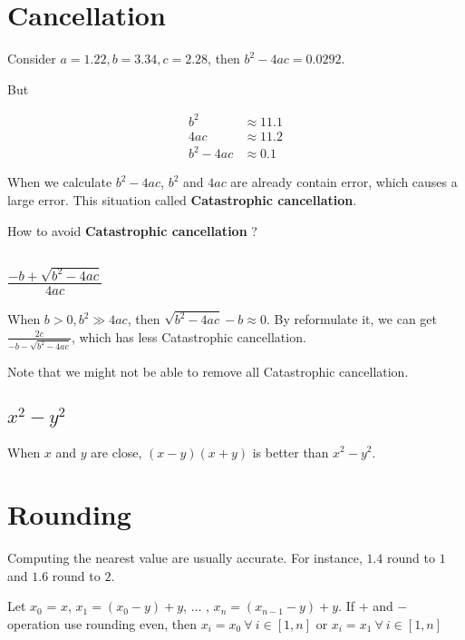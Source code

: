 \section{Cancellation}

Consider $a = 1.22, b = 3.34, c = 2.28$, then $b^2 - 4ac = 0.0292$.

But

\begin{align}
    b^2       &\approx 11.1 \nonumber \\
    4ac       &\approx 11.2 \nonumber \\
    b^2 - 4ac &\approx  0.1 \nonumber
\end{align}

When we calculate $b^2 - 4ac$, $b^2$ and $4ac$ are already contain error,
which causes a large error. This situation called \textbf{Catastrophic cancellation}.

How to avoid \textbf{Catastrophic cancellation} ?

\subsection{$\frac{-b + \sqrt{b^2 - 4ac}}{4ac}$}

When $b > 0, b^2 \gg 4ac$, then $\sqrt{b^2 - 4ac} - b \approx 0$.
By reformulate it, we can get $\frac{2c}{- b - \sqrt{b^2 - 4ac}}$,
which has less Catastrophic cancellation.

Note that we might not be able to remove all Catastrophic cancellation.

\subsection{$x^2 - y^2$}

When $x$ and $y$ are close, $(x-y)(x+y)$ is better than $x^2 - y^2$.

\section{Rounding}

Computing the nearest value are usually accurate.
For instance, $1.4$ round to $1$ and  $1.6$ round to $2$.

\begin{theorem}
    Let $x_0$ = $x$, $x_1 = (x_0-y)+y$, $\dots$ , $x_n = (x_{n-1}-y)+y$.
    If $+$ and $-$ operation use rounding even, then
    $x_i = x_0 \ \forall \ i \in [1, n]$ or 
    $x_i = x_1 \ \forall \ i \in [1, n]$
\end{theorem}

